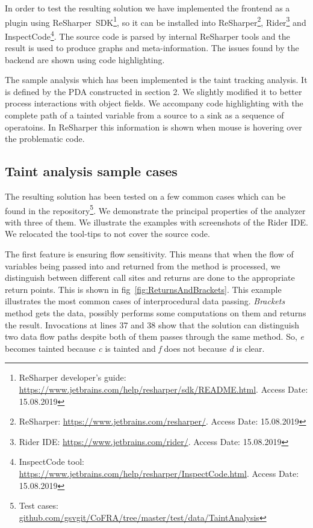 In order to test the resulting solution we have implemented the frontend as a plugin using ReSharper~SDK\footnote{ReSharper developer's guide: \url{https://www.jetbrains.com/help/resharper/sdk/README.html}. Access Date: 15.08.2019}, so it can be installed into ReSharper\footnote{ReSharper: \url{https://www.jetbrains.com/resharper/}. Access Date: 15.08.2019}, Rider\footnote{Rider IDE: \url{https://www.jetbrains.com/rider/}. Access Date: 15.08.2019} and InspectCode\footnote{InspectCode tool: \url{https://www.jetbrains.com/help/resharper/InspectCode.html}. Access Date: 15.08.2019}.
The source code is parsed by internal ReSharper tools and the result is used to produce graphs and meta-information.
The issues found by the backend are shown using code highlighting.

The sample analysis which has been implemented is the taint tracking analysis.
It is defined by the PDA constructed in section 2.
We slightly modified it to better process interactions with object fields.
We accompany code highlighting with the complete path of a tainted variable from a source to a sink as a sequence of operatoins.
In ReSharper this information is shown when mouse is hovering over the problematic code.

\subsection{Taint analysis sample cases}

The resulting solution has been tested on a few common cases which can be found in the repository\footnote{Test cases: \url{github.com/gsvgit/CoFRA/tree/master/test/data/TaintAnalysis}}.
We demonstrate the principal properties of the analyzer with three of them.
We illustrate the examples with screenshots of the Rider IDE.
We relocated the tool-tips to not cover the source code.

The first feature is ensuring flow sensitivity.
This means that when the flow of variables being passed into and returned from the method is processed, we distinguish between different call sites and returns are done to the appropriate return points.
This is shown in fig~\ref{fig:ReturnsAndBrackets}.
This example illustrates the most common cases of interprocedural data passing.
\textit{Brackets} method gets the data, possibly performs some computations on them and returns the result.
Invocations at lines 37 and 38 show that the solution can distinguish two data flow paths despite both of them passes through the same method.
So, \textit{e} becomes tainted because \textit{c} is tainted and \textit{f} does not because \textit{d} is clear.

